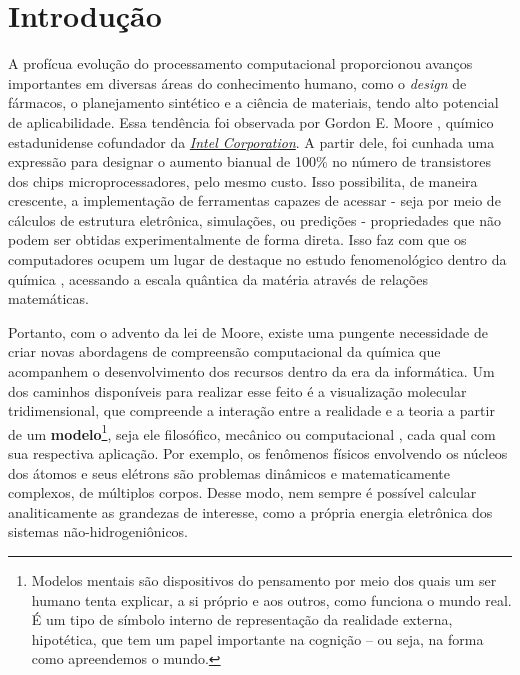 \chapter{Introdução}

A profícua evolução do processamento computacional proporcionou avanços importantes em diversas áreas do conhecimento humano, como o \textit{design} de fármacos, o planejamento sintético e a ciência de materiais, tendo alto potencial de aplicabilidade. Essa tendência foi observada por Gordon E. Moore \autocite{Mack2011, Shalf2020}, químico estadunidense 
cofundador da \href{https://www.intel.com/content/www/us/en/company-overview/company-overview.html}{\textit{Intel Corporation}}. A partir dele, foi cunhada uma expressão para designar o aumento bianual de 100\% no número de transistores dos chips microprocessadores, pelo mesmo custo. Isso possibilita, de maneira crescente, a implementação de ferramentas capazes de acessar - seja por meio de cálculos de estrutura eletrônica, 
simulações, ou predições - propriedades que não podem ser obtidas experimentalmente de forma direta. Isso faz com que os computadores ocupem um lugar de destaque no estudo fenomenológico dentro da  química \autocite{Allouche2010, Rayan2017}, acessando a escala quântica da matéria através de relações matemáticas.

Portanto, com o advento da lei de Moore, existe uma pungente necessidade de criar novas abordagens de compreensão computacional da química que acompanhem o desenvolvimento dos recursos dentro da era da informática. Um dos caminhos disponíveis para realizar esse feito é a visualização molecular tridimensional, que compreende a interação entre a realidade e a teoria a partir de um \textbf{modelo}\footnote{Modelos mentais são dispositivos do pensamento por meio dos quais um ser humano tenta explicar, a si próprio e aos outros, como funciona o mundo real. É um tipo de símbolo interno de representação da realidade externa, hipotética, que tem um papel importante na cognição – ou seja, na forma como apreendemos o mundo.}, seja ele filosófico, mecânico ou computacional \autocite{Snyder2021}, cada qual com sua respectiva aplicação. Por exemplo, os fenômenos físicos envolvendo os núcleos dos átomos e seus elétrons são problemas dinâmicos e matematicamente complexos, de múltiplos corpos. Desse modo, nem sempre é possível calcular analiticamente as grandezas de interesse, como a própria energia eletrônica dos sistemas não-hidrogeniônicos.


